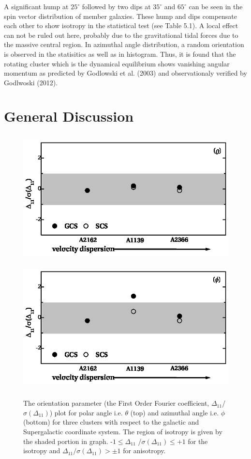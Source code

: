 \noindent A significant hump at $25^\circ$ followed by two dips at $35^\circ$ and $65^\circ$ can be seen in the spin vector distribution of member galaxies. These hump and dips compensate each other to show isotropy in the statistical test (see Table 5.1). A local effect can  not be ruled out here, probably due to the gravitational tidal forces due to the massive central region. In azimuthal angle distribution, a random orientation is observed in the statisitics as well as in histogram. Thus, it is found that the rotating cluster which is the dynamical equilibrium shows vanishing angular momentum as predicted by Godlowski et al. (2003) and observationaly verified by Godlwoski (2012).
\section{General Discussion}
\begin{figure}[H]
\centering
\includegraphics[height=6.9cm]{polar.eps}\\
 \includegraphics[height=6.9cm]{phi.eps}
     \caption{The orientation parameter (the First Order Fourier coefficient,  $\Delta_{11}$/$\sigma(\Delta_{11})$) plot for polar angle i.e. $\theta$ (top) and azimuthal angle i.e. $\phi$  (bottom) for three clusters with respect to the galactic and Supergalactic coordinate system. The region of isotropy is given by the shaded portion in graph.
-$1\leq\Delta_{11}$ /$\sigma(\Delta_{11})\leq +1$ for the isotropy and $\Delta_{11}/\sigma(\Delta_{11}) > \pm 1$ for anisotropy.} 
\end{figure}
